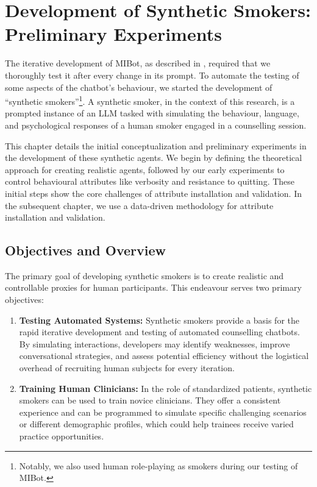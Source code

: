 \chapter{Development of Synthetic Smokers: Preliminary Experiments}
\label{ch:synthetic-smoker}

The iterative development of MIBot, as described in , required that we thoroughly test it after every change in its prompt. To automate the testing of some aspects of the chatbot's behaviour, we started the development of ``synthetic smokers''\footnote{Notably, we also used human role-playing as smokers during our testing of MIBot.}. A synthetic smoker, in the context of this research, is a prompted instance of an LLM tasked with simulating the behaviour, language, and psychological responses of a human smoker engaged in a counselling session.

This chapter details the initial conceptualization and preliminary experiments in the development of these synthetic agents. We begin by defining the theoretical approach for creating realistic agents, followed by our early experiments to control behavioural attributes like verbosity and resistance to quitting. These initial steps show the core challenges of attribute installation and validation. In the subsequent chapter, we use a data-driven methodology for attribute installation and validation.

\section{Objectives and Overview}
\label{sec:synthetic-smoker-goals}

The primary goal of developing synthetic smokers is to create realistic and controllable proxies for human participants. This endeavour serves two primary objectives:

\begin{enumerate}
	\item \textbf{Testing Automated Systems:} Synthetic smokers provide a basis for the rapid iterative development and testing of automated counselling chatbots. By simulating interactions, developers may identify weaknesses, improve conversational strategies, and assess potential efficiency without the logistical overhead of recruiting human subjects for every iteration.
	\item \textbf{Training Human Clinicians:} In the role of standardized patients, synthetic smokers can be used to train novice clinicians. They offer a consistent experience and can be programmed to simulate specific challenging scenarios or different demographic profiles, which could help trainees receive varied practice opportunities.
\end{enumerate}

